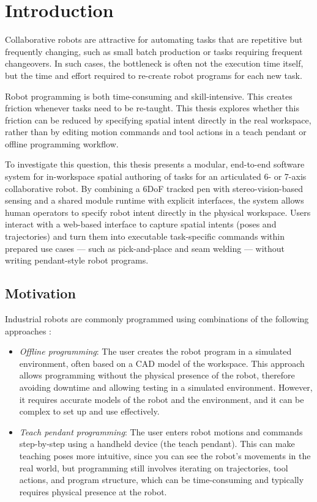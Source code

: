 \chapter*{Introduction}

Collaborative robots are attractive for automating tasks that are repetitive but frequently changing, such as small batch production or tasks requiring frequent changeovers. In such cases, the bottleneck is often not the execution time itself, but the time and effort required to re-create robot programs for each new task.

Robot programming is both time-consuming \cite{IFR2023TraditionalVsNew} and skill-intensive. This creates friction whenever tasks need to be re-taught. This thesis explores whether this friction can be reduced by specifying spatial intent directly in the real workspace, rather than by editing motion commands and tool actions in a teach pendant or offline programming workflow.

To investigate this question, this thesis presents a modular, end-to-end software system for in-workspace spatial authoring of tasks for an articulated 6- or 7-axis collaborative robot. By combining a 6DoF tracked pen with stereo-vision-based sensing and a shared module runtime with explicit interfaces, the system allows human operators to specify robot intent directly in the physical workspace. Users interact with a web-based interface to capture spatial intents (poses and trajectories) and turn them into executable task-specific commands within prepared use cases --- such as pick-and-place and seam welding --- without writing pendant-style robot programs.


\section*{Motivation}

Industrial robots are commonly programmed using combinations of the following approaches \cite{VILLANI201866}:
\begin{itemize}
    \item \emph{Offline programming}: The user creates the robot program in a simulated environment, often based on a CAD model of the workspace. This approach allows programming without the physical presence of the robot, therefore avoiding downtime and allowing testing in a simulated environment. However, it requires accurate models of the robot and the environment, and it can be complex to set up and use effectively.
    \item \emph{Teach pendant programming}: The user enters robot motions and commands step-by-step using a handheld device (the teach pendant). This can make teaching poses more intuitive, since you can see the robot's movements in the real world, but programming still involves iterating on trajectories, tool actions, and program structure, which can be time-consuming and typically requires physical presence at the robot.
\end{itemize}

